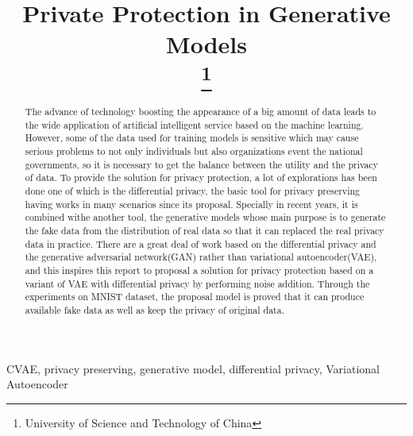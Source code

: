 \documentclass[conference]{IEEEtran}
\begin{document}
\title{Private Protection in Generative Models\\
\thanks{University of Science and Technology of China}
}

\author{
\and
{}
\and
{}
}

\maketitle

\begin{abstract}
The advance of technology boosting the appearance of a big amount of data leads to the wide application of artificial intelligent service based on the machine learning. However, some of the data used for training models is sensitive which may cause serious problems to not only individuals but also organizations event the national governments, so it is necessary to get the balance between the utility and the privacy of data. To provide the solution for privacy protection, a lot of explorations has been done one of which is the differential privacy, the basic tool for privacy preserving having works in many scenarios since its proposal. Specially in recent years, it is combined withe another tool, the generative models whose main purpose is to generate the fake data from the distribution of real data so that it can replaced the real privacy data in practice. There are a great deal of work based on the differential privacy and the generative adversarial network(GAN) rather than variational autoencoder(VAE), and this inspires this report to proposal a solution for privacy protection based on a variant of VAE with differential privacy by performing noise addition. Through the experiments on MNIST dataset, the proposal model is proved that it can produce available fake data as well as keep the privacy of original data.
\end{abstract}

\begin{IEEEkeywords}
CVAE, privacy preserving, generative model, differential privacy, Variational Autoencoder
\end{IEEEkeywords}
\end{document}
